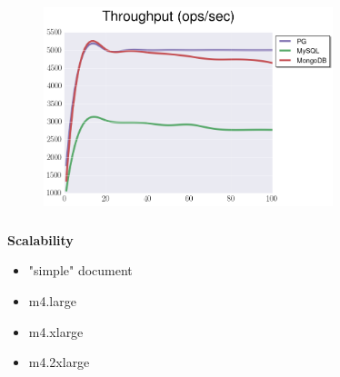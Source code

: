 \documentclass[usenames,dvipsnames, 18pt, compress, aspectratio=169]{beamer}
\begin{document}
\begin{frame}
    \frametitle{}
    \begin{center}
    \begin{figure}
        \includegraphics[width=0.75\textwidth,center]{benchmarks/select_complex_btree_throughput.png}
    \end{figure}
    \end{center}
\end{frame}


\begin{frame}
    \frametitle{}
    \begin{center}
        \textbf{Scalability}
        \begin{itemize}[label={}]
            \item "simple" document
            \item m4.large
            \item m4.xlarge
            \item m4.2xlarge
        \end{itemize}
    \end{center}
\end{frame}
\end{document}
